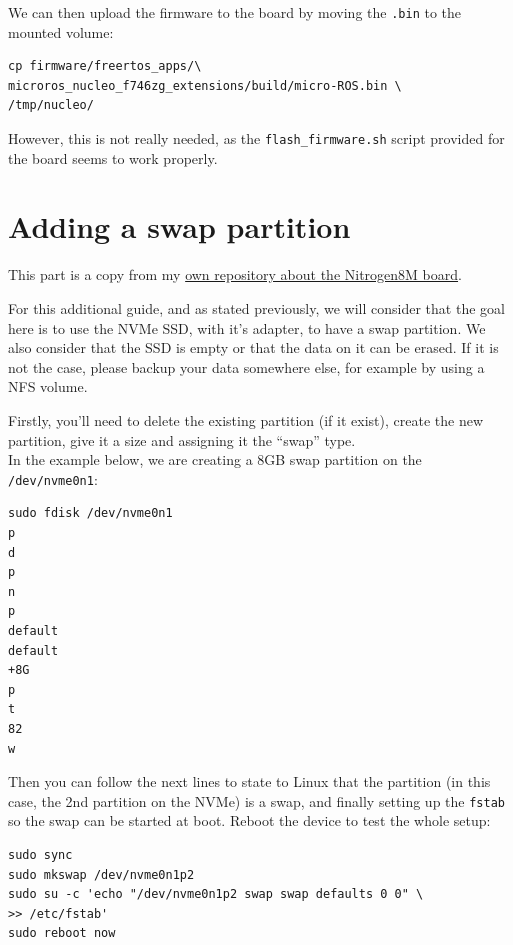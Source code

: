 \documentclass[10pt]{article}
\begin{document}
We can then upload the firmware to the board by moving the \verb|.bin| to the mounted volume:
\begin{tcolorbox}
\begin{verbatim}
cp firmware/freertos_apps/\
microros_nucleo_f746zg_extensions/build/micro-ROS.bin \
/tmp/nucleo/
\end{verbatim}
\end{tcolorbox}

However, this is not really needed, as the \verb|flash_firmware.sh| script provided for the board seems to work properly.

\pagebreak
\section{Adding a swap partition}
\label{appendix:adding-swap-part}
This part is a copy from my \href{https://gitlab.com/nitrogen8m/documentation/}{own repository about the Nitrogen8M board}.

For this additional guide, and as stated previously, we will consider that the goal here is to use the NVMe SSD, with it's adapter, to have a swap partition. We also consider that the SSD is empty or that the data on it can be erased. If it is not the case, please backup your data somewhere else, for example by using a NFS volume.

Firstly, you'll need to delete the existing partition (if it exist), create the new partition, give it a size and assigning it the ``swap'' type.\\
In the example below, we are creating a 8GB swap partition on the \verb|/dev/nvme0n1|:
\begin{tcolorbox}
\begin{verbatim}
sudo fdisk /dev/nvme0n1
p
d
p
n
p
default
default
+8G
p
t
82
w
\end{verbatim}
\end{tcolorbox}

Then you can follow the next lines to state to Linux that the partition (in this case, the 2nd partition on the NVMe) is a swap, and finally setting up the \verb|fstab| so the swap can be started at boot. Reboot the device to test the whole setup:
\begin{tcolorbox}
\begin{verbatim}
sudo sync
sudo mkswap /dev/nvme0n1p2
sudo su -c 'echo "/dev/nvme0n1p2 swap swap defaults 0 0" \
>> /etc/fstab'
sudo reboot now
\end{verbatim}
\end{tcolorbox}
\end{document}
